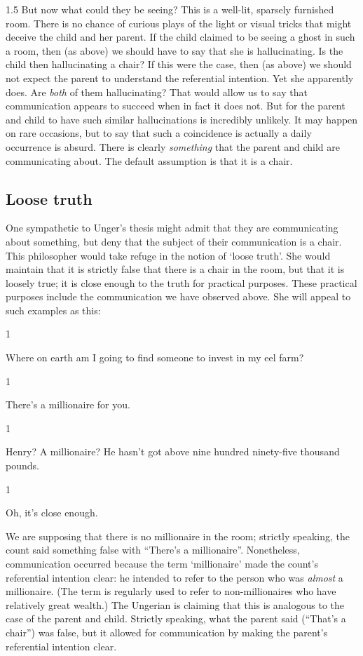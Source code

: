 \documentclass[11pt]{article}
\newcommand{\stage}[3]%
{%
	\begin{spacing}{1}%
	\vspace{0pt}
		\begin{description}[style=nextline, parsep=0pt, leftmargin=15mm, itemindent=-10mm, font=\mdseries]
			\item[\textsc{#1} \emph{#2}] #3
		\end{description}%
	\end{spacing}%
}
\begin{document}
\begin{spacing}{1.5}
But now what could they be seeing? This is a well-lit, sparsely furnished room. There is no chance of curious plays of the light or visual tricks that might deceive the child and her parent. If the child claimed to be seeing a ghost in such a room, then (as above) we should have to say that she is hallucinating. Is the child then hallucinating a chair? If this were the case, then (as above) we should not expect the parent to understand the referential intention. Yet she apparently does. Are {\em both} of them hallucinating? That would allow us to say that communication appears to succeed when in fact it does not. But for the parent and child to have such similar hallucinations is incredibly unlikely. It may happen on rare occasions, but to say that such a coincidence is actually a daily occurrence is absurd. There is clearly {\em something} that the parent and child are communicating about. The default assumption is that it is a chair.

\subsection{Loose truth}
\label{loose-u}
One sympathetic to Unger's thesis might admit that they are communicating about something, but deny that the subject of their communication is a chair. This philosopher would take refuge in the notion of `loose truth'. She would maintain that it is strictly false that there is a chair in the room, but that it is loosely true; it is close enough to the truth for practical purposes. These practical purposes include the communication we have observed above. She will appeal to such examples as this:

\stage{Countess}{}{Where on earth am I going to find someone to invest in my eel farm?}

\stage{Count}{(pointing)}{There's a millionaire for you.}

\stage{Countess}{(incredulous)}{Henry? A millionaire? He hasn't got above nine hundred ninety-five thousand pounds.}

\stage{Count}{}{Oh, it's close enough.}

We are supposing that there is no millionaire in the room; strictly speaking, the count said something false with ``There's a millionaire''. Nonetheless, communication occurred because the term `millionaire' made the count's referential intention clear: he intended to refer to the person who was {\em almost} a millionaire. (The term is regularly used to refer to non-millionaires who have relatively great wealth.) The Ungerian is claiming that this is analogous to the case of the parent and child. Strictly speaking, what the parent said (``That's a chair'') was false, but it allowed for communication by making the parent's referential intention clear.


\end{spacing}
\end{document}
